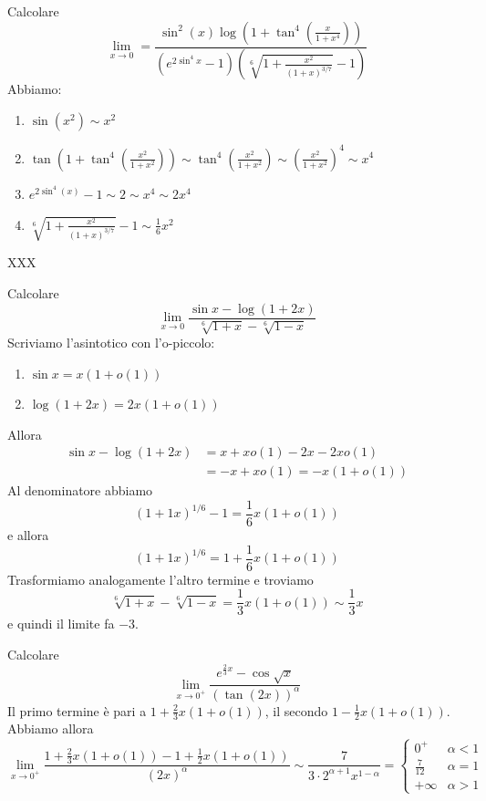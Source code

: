 \documentclass[a4paper]{article}
\begin{document}
\begin{snippetexercise}{}
    Calcolare
    \[
        \lim_{x\to 0} = \frac{
            \sin^2(x)\log(1 + \tan^4(\frac{x}{1 + x^4}))
        }{
            \left(e^{2\sin^4x} - 1\right)
            \left(\sqrt[6]{1 + \frac{x^2}{(1 + x)^{3/7}}} - 1\right)
        }
    \]
    Abbiamo:
    \begin{enumerate}
        \item \(\sin(x^2) \sim x^2\)
        \item \(\tan(1 + \tan^4(\frac{x^2}{1 + x^2})) \sim \tan^4(\frac{x^2}{1 + x^2})\sim {\left(\frac{x^2}{1 + x^2}\right)}^4 \sim x^4\)
        \item \(e^{2\sin^4(x)} - 1 \sim 2\sim x^4 \sim 2x^4\)
        \item \(\sqrt[6]{1 + \frac{x^2}{(1 + x)^{3/7}}} - 1 \sim \frac{1}{6}x^2\)
    \end{enumerate}
    XXX
\end{snippetexercise}

\begin{snippetexercise}{}
    Calcolare
    \[
        \lim_{x\to 0} \frac{
            \sin x - \log(1 + 2x)
        }{
            \sqrt[6]{1 + x} - \sqrt[6]{1 - x}
        }
    \]
    Scriviamo l'asintotico con l'o-piccolo:
    \begin{enumerate}
        \item \(\sin x= x(1 + o(1))\)
        \item \(\log(1 + 2x) = 2x(1 + o(1))\)
    \end{enumerate}
    Allora
    \begin{align*}
        \sin x - \log(1 + 2x) &= x + xo(1) - 2x - 2xo(1) \\
        &= -x + xo(1) = -x(1 + o(1))
    \end{align*}
    Al denominatore abbiamo
    \[
        {\left(1 + 1x\right)}^{1/6} - 1
        = \frac{1}{6}x(1 + o(1))
    \]
    e allora
    \[
        {\left(1 + 1x\right)}^{1/6} = 1 + \frac{1}{6}x(1 + o(1))
    \]
    Trasformiamo analogamente l'altro termine e troviamo
    \[
        \sqrt[6]{1 + x} - \sqrt[6]{1 - x}
        = \frac{1}{3}x(1 + o(1)) \sim \frac{1}{3}x
    \]
    e quindi il limite fa \(-3\).
\end{snippetexercise}

\begin{snippetexercise}{}
    Calcolare
    \[
        \lim_{x\to 0^+}
        \frac{
            e^{\frac{2}{3}x} - \cos\sqrt{x}
        }{
            {\left(\tan(2x)\right)}^\alpha
        }
    \]
    Il primo termine è pari a \(1 + \frac{2}{3}x(1 + o(1))\),
    il secondo \(1 - \frac{1}{2}x(1 + o(1))\).
    Abbiamo allora
    \[
        \lim_{x\to 0^+} \frac{
            1 + \frac{2}{3}x(1 + o(1)) - 1 + \frac{1}{2}x(1 + o(1))
        }{
            {(2x)}^\alpha
        }
        \sim \frac{7}{3\cdot 2^{\alpha + 1} x^{1 - \alpha}}
        = \begin{cases}
            0^+ & \alpha < 1 \\
            \frac{7}{12} & \alpha = 1 \\
            + \infty & \alpha > 1
        \end{cases}
    \]
\end{snippetexercise}
\end{document}
